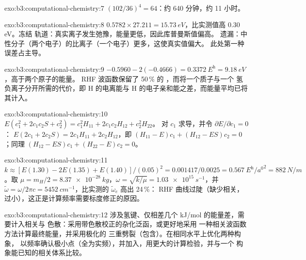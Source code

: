 \begin{solution}{exo:b3:computational-chemistry:7}
$(102/36)^4 = 64$：约 640 分钟，约 11 小时。
\end{solution}

\begin{solution}{exo:b3:computational-chemistry:8}
$0.5782 \times 27.211 = \qty{15.73}{eV}$，比实测值高 0.30 eV。冻结
轨道：真实离子发生弛豫，能量更低，因此库普曼斯值偏高。
遗漏：中性分子（两个电子）的比离子（一个电子）更多，这使真实值偏大。
此处第一种误差占主导。
\end{solution}

\begin{solution}{exo:b3:computational-chemistry:9}
$-0.5960 - 2(-0.4666) = \qty{0.3372}{\hartree} = \qty{9.18}{eV}$，高于两个原子的能量。
RHF 波函数保留了 50\,\% 的 ，而将一个质子与一个
氢负离子分开所需的代价，即 H 的电离能与
H 的电子亲和能之差，而能量平均已将其计入。
\end{solution}

\begin{solution}{exo:b3:computational-chemistry:10}
$E(c_1^2 + 2c_1c_2S + c_2^2) = c_1^2H_{11} + 2c_1c_2H_{12} + c_2^2H_{22}$。
对 $c_1$ 求导，并令 $\partial E/\partial c_1 = 0$：
$E(2c_1 + 2c_2S) = 2c_1H_{11} + 2c_2H_{12}$，即 $(H_{11} - E)c_1 + (H_{12} -
ES)c_2 = 0$；同理 $(H_{12} - ES)c_1 + (H_{22} - E)c_2 = 0$。
\end{solution}

\begin{solution}{exo:b3:computational-chemistry:11}
$k \approx [E(1.30) - 2E(1.35) + E(1.40)]/(0.05)^2 = 0.001417/0.0025 =
\qty{0.567}{\hartree\per\bohr\squared} = \qty{882}{N/m}$。取 $\mu = m_H/2 =
\qty{8.37e-28}{kg}$，$\omega = \sqrt{k/\mu} = \qty{1.03e15}{s^{-1}}$，并
$\tilde\omega = \omega/2\pi c = \qty{5452}{cm^{-1}}$，比实测的
$\tilde\omega_e$ 高出 24\,\%： RHF 曲线过陡（缺少相关，
过小），这正是计算频率需要标度修正的原因。
\end{solution}

\begin{solution}{exo:b3:computational-chemistry:12}
涉及氢键、仅相差几个 \unit{kJ/mol} 的能量差，需要计入相关与
色散：采用带色散校正的杂化泛函，或更好地采用
一种相关波函数方法计算最终能量，并采用极化的
三重劈裂（包含）。在相同水平上优化两种构象，
以频率确认极小点（全为实频），并加入，用更大的计算检验，并与一个
构象能已知的相关体系比较。
\end{solution}

